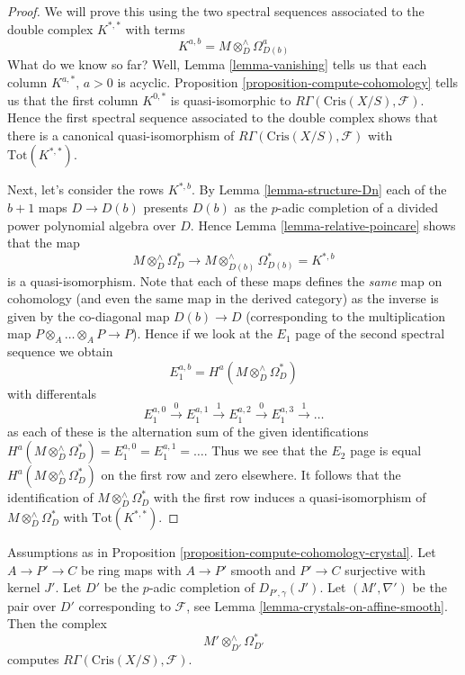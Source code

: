 \begin{proof}
We will prove this using the two spectral sequences associated to the
double complex $K^{*, *}$ with terms
$$
K^{a, b} = M \otimes_D^\wedge \Omega^a_{D(b)}
$$
What do we know so far? Well, Lemma \ref{lemma-vanishing}
tells us that each column $K^{a, *}$, $a > 0$ is acyclic.
Proposition \ref{proposition-compute-cohomology} tells us that
the first column $K^{0, *}$ is quasi-isomorphic to
$R\Gamma(\text{Cris}(X/S), \mathcal{F})$.
Hence the first spectral sequence associated to the double complex
shows that there is a canonical quasi-isomorphism of
$R\Gamma(\text{Cris}(X/S), \mathcal{F})$ with
$\text{Tot}(K^{*, *})$.

\medskip\noindent
Next, let's consider the rows $K^{*, b}$. By
Lemma \ref{lemma-structure-Dn}
each of the $b + 1$ maps $D \to D(b)$ presents $D(b)$ as the $p$-adic
completion of a divided power polynomial algebra over $D$.
Hence Lemma \ref{lemma-relative-poincare} shows that the map
$$
M \otimes^\wedge_D\Omega^*_D
\longrightarrow
M \otimes^\wedge_{D(b)} \Omega^*_{D(b)} = K^{*, b}
$$
is a quasi-isomorphism. Note that each of these maps defines the {\it same}
map on cohomology (and even the same map in the derived category) as
the inverse is given by the co-diagonal map $D(b) \to D$ (corresponding
to the multiplication map $P \otimes_A \ldots \otimes_A P \to P$).
Hence if we look at the $E_1$ page of the second spectral sequence
we obtain
$$
E_1^{a, b} = H^a(M \otimes^\wedge_D\Omega^*_D)
$$
with differentals
$$
E_1^{a, 0} \xrightarrow{0}
E_1^{a, 1} \xrightarrow{1}
E_1^{a, 2} \xrightarrow{0}
E_1^{a, 3} \xrightarrow{1} \ldots
$$
as each of these is the alternation sum of the given identifications
$H^a(M \otimes^\wedge_D\Omega^*_D) = E_1^{a, 0} = E_1^{a, 1} = \ldots$.
Thus we see that the $E_2$ page is equal $H^a(M \otimes^\wedge_D\Omega^*_D)$
on the first row and zero elsewhere. It follows that the identification
of $M \otimes^\wedge_D\Omega^*_D$ with the first row induces a
quasi-isomorphism of $M \otimes^\wedge_D\Omega^*_D$ with
$\text{Tot}(K^{*, *})$.
\end{proof}

\begin{lemma}
\label{lemma-compute-cohomology-crystal-smooth}
Assumptions as in Proposition \ref{proposition-compute-cohomology-crystal}.
Let $A \to P' \to C$ be ring maps with $A \to P'$ smooth and $P' \to C$
surjective with kernel $J'$. Let $D'$ be the $p$-adic completion of
$D_{P', \gamma}(J')$. Let $(M', \nabla')$ be the pair over $D'$
corresponding to $\mathcal{F}$, see
Lemma \ref{lemma-crystals-on-affine-smooth}. Then the complex
$$
M' \otimes^\wedge_{D'} \Omega^*_{D'}
$$
computes $R\Gamma(\text{Cris}(X/S), \mathcal{F})$.
\end{lemma}

